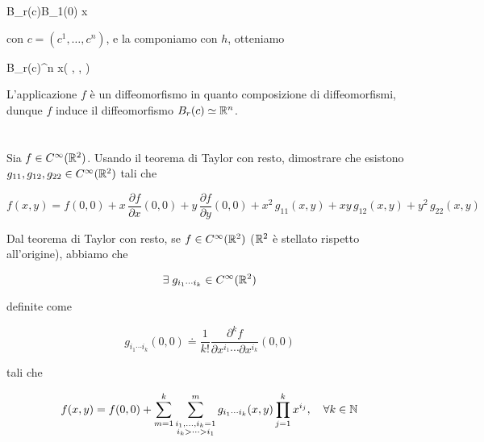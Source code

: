 	{B_{r}(c)}{B_{1}(0)}
	{x}{}
	
con $ c = (c^{1},\dots,c^{n}) $, e la componiamo con $ h $, otteniamo

	{B_{r}(c)}{\R^{n}}
	{x}{\left( , \cdots,  \right)}

L'applicazione $ f $ è un diffeomorfismo in quanto composizione di diffeomorfismi, dunque $ f $ induce il diffeomorfismo $ B_{r}(c) \simeq \mathbb{R}^{n} $.

%

\newpage

%

\section{}\label{es1-5}

\begin{tcolorbox}
	Sia $ f \in C^{\infty}(\mathbb{R}^{2}) $. Usando il teorema di Taylor con resto, dimostrare che esistono $ g_{11},g_{12},g_{22} \in C^{\infty}(\mathbb{R}^{2}) $ tali che
	
	\begin{equation}
		f(x,y) = f(0,0) + x \, \dfrac{\partial f}{\partial x} (0,0) + y \, \dfrac{\partial f}{\partial y} (0,0) + x^{2} \, g_{11}(x,y) + x y \, g_{12}(x,y) + y^{2} \, g_{22}(x,y)
	\end{equation}
\end{tcolorbox}

Dal teorema di Taylor con resto, se $ f \in C^{\infty} (\mathbb{R}^{2}) $ ($ \mathbb{R}^{2} $ è stellato rispetto all'origine), abbiamo che

\begin{equation}
	\exists \; g_{i_{1} \cdots i_{k}} \in C^{\infty} (\mathbb{R}^{2})
\end{equation}

definite come

\begin{equation}
	g_{i_{1} \cdots i_{k}} (0,0) \doteq \dfrac{1}{k!} \dfrac{\partial^{k} f}{\partial x^{i_{1}} \cdots \partial x^{i_{k}}} (0,0)
\end{equation}

tali che

\begin{equation}
	f(x,y) = f(0,0) + \sum_{m=1}^{k} \sum_{\substack{i_{1},\dots,i_{k}=1 \\ {i_{k}} > \cdots > i_{1}}}^{m} g_{i_{1} \cdots i_{k}} (x,y) \prod_{j=1}^{k} x^{i_{j}} \qcomma \forall k \in \N
\end{equation}

